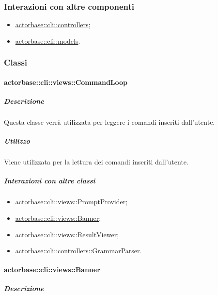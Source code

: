 \documentclass{scalatekids-article}
\begin{document}
\subsubsection{Interazioni con altre componenti}

\begin{itemize}
\item \hyperref[sec:actorbase::cli::controllers]{actorbase::cli::controllers};
\item \hyperref[sec:actorbase::cli::models]{actorbase::cli::models}.
\end{itemize}

\subsubsection{Classi}

\paragraph{actorbase::cli::views::CommandLoop}
\label{sec:actorbase::cli::views::CommandLoop}

\subparagraph{Descrizione}

Questa classe verrà utilizzata per leggere i comandi inseriti dall'utente.

\subparagraph{Utilizzo}

Viene utilizzata per la lettura dei comandi inseriti dall'utente.

\subparagraph{Interazioni con altre classi}

\begin{itemize}
\item \hyperref[sec:actorbase::cli::views::PromptProvider]{actorbase::cli::views::PromptProvider};
\item \hyperref[sec:actorbase::cli::views::Banner]{actorbase::cli::views::Banner};
\item \hyperref[sec:actorbase::cli::views::ResultViewer]{actorbase::cli::views::ResultViewer};
\item \hyperref[sec:actorbase::cli::controllers::GrammarParser]{actorbase::cli::controllers::GrammarParser}.
\end{itemize}

\paragraph{actorbase::cli::views::Banner}
\label{sec:actorbase::cli::views::Banner}

\subparagraph{Descrizione}
\end{document}
